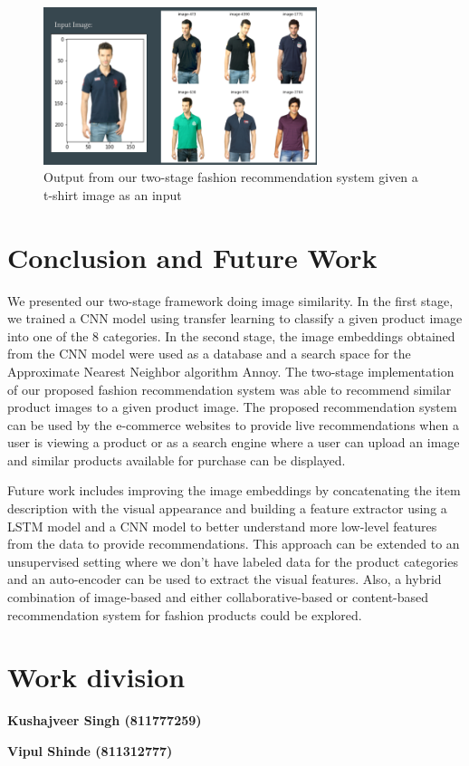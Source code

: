 \documentclass[12pt,twocolumn,letterpaper,Times New Roman]{article}
\begin{document}
\begin{figure}[!h]
    \centering
    \includegraphics[width=80mm]{fig_6.png}
    \caption{Output from our two-stage fashion recommendation system given a t-shirt image as an input}
    \label{fig:15}
\end{figure}


\section{Conclusion and Future Work}
We presented our two-stage framework doing image similarity. In the first stage,
we trained a CNN model using transfer learning to classify a given product image into one of the 8 categories. In the second stage, the image embeddings obtained from the CNN model were used as a database and a search space for the Approximate Nearest Neighbor algorithm Annoy. The two-stage implementation of our proposed fashion recommendation system was able to recommend similar product images to a given product image. The proposed recommendation system can be used by the e-commerce websites to provide live recommendations when a user is viewing a product or as a search engine where a user can upload an image and similar products available for purchase can be displayed.

Future work includes improving the image embeddings by concatenating the item description with the visual appearance and building a feature extractor using a LSTM model and a CNN model to better understand more low-level features from the data to provide recommendations. This approach can be extended to an unsupervised setting where we don’t have labeled data for the product categories and an auto-encoder can be used to extract the visual features. Also, a hybrid combination of image-based and either collaborative-based or content-based recommendation system for fashion products could be explored.

\section{Work division}
\textbf{Kushajveer Singh (811777259)}

\textbf{Vipul Shinde (811312777)}

{\small


}
\end{document}

